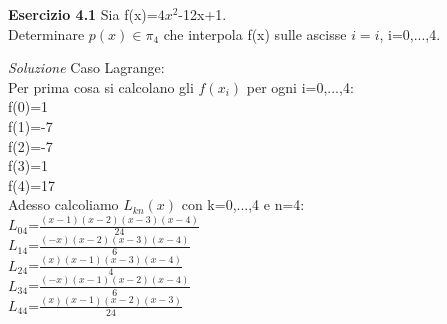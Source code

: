 \documentclass[20pt,a4paper]{book}
\begin{document}

\textbf{\Large{Esercizio 4.1}}
Sia f(x)=\begin{math}4x^{2}\end{math}-12x+1.\\
Determinare \begin{math} p(x)\in\pi_{4} \end{math} che interpola f(x) sulle ascisse \begin{math}{i}=i \end{math}, i=0,...,4.

\textit{Soluzione}
Caso Lagrange:
\\Per prima cosa si calcolano gli \begin{math}f(x_{i})\end{math} per ogni i=0,...,4:\\
f(0)=1\\
f(1)=-7\\
f(2)=-7\\
f(3)=1\\
f(4)=17\\

Adesso calcoliamo \begin{math}L_{kn}(x)\end{math} con k=0,...,4 e n=4:\\
\begin{math}L_{04}\end{math}=\begin{math}\frac{(x-1)(x-2)(x-3)(x-4)}{24}\end{math}\\

\begin{math}L_{14}\end{math}=\begin{math}\frac{(-x)(x-2)(x-3)(x-4)}{6}\end{math}\\
\begin{math}L_{24}\end{math}=\begin{math}\frac{(x)(x-1)(x-3)(x-4)}{4}\end{math}\\
\begin{math}L_{34}\end{math}=\begin{math}\frac{(-x)(x-1)(x-2)(x-4)}{6}\end{math}\\
\begin{math}L_{44}\end{math}=\begin{math}\frac{(x)(x-1)(x-2)(x-3)}{24}\end{math}\\
\end{document}
